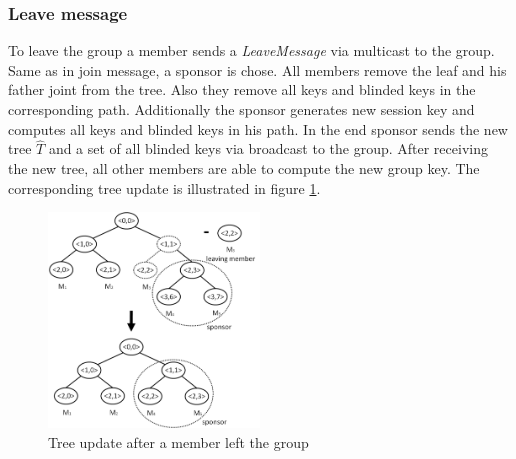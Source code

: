 \subsubsection{Leave message}
To leave the group a member sends a \textit{LeaveMessage} via multicast to the group. Same as in join message, a sponsor is chose. All members remove the leaf and his father joint from the tree. Also they remove all keys and blinded keys in the corresponding path. Additionally the sponsor generates new session key and computes all keys and blinded keys in his path. In the end sponsor sends the new tree $\widehat{T}$ and a set of all blinded keys via broadcast to the group. After receiving the new tree, all other members are able to compute the new group key. The corresponding tree update is illustrated in figure \ref{fig:tgdh_leave}.
\begin{figure}[!h]
\centering\includegraphics[width=0.5\textwidth]{Images/tgdh_leave}
\caption{Tree update after a member left the group}
\label{fig:tgdh_leave}
\end{figure}\noindent